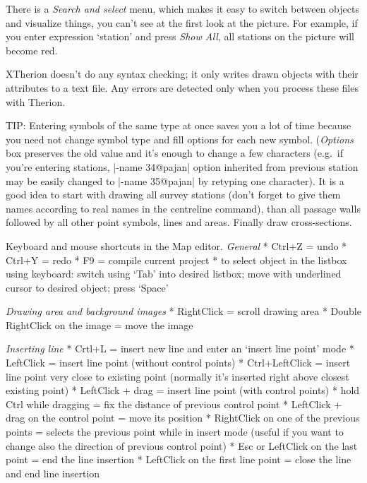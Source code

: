 
There is a {\it Search and select} menu, which makes it easy to
switch between objects and visualize things, you can't see at the first 
look at the picture. For example, if you enter expression `station' and 
press {\it Show All}, all stations on the picture will become red. 

XTherion doesn't do any syntax checking; it only writes drawn objects with their 
attributes to a text file. Any errors are detected only when you process these 
files with Therion.

TIP: Entering symbols of the same type at once saves you a lot of time 
because you need not change symbol type and fill options for each new symbol.
({\it Options} box preserves the old value and it's enough to change a few 
characters (e.g.~if you're entering stations, |-name 34@pajan| option inherited 
from previous station may be easily changed to |-name 35@pajan| by retyping one 
character). 
It is a good idea to start with drawing all survey stations (don't forget to 
give them names according to real names in the centreline command), than all 
passage walls followed by all other point symbols, lines and areas. Finally 
draw cross-sections.

\subsubchapter Keyboard and mouse shortcuts in the Map editor.
{\it General}
\list
 * Ctrl+Z = undo
 * Ctrl+Y = redo
 * F9 = compile current project
 * to select object in the listbox using keyboard:
    switch using `Tab' into desired listbox;
    move with underlined cursor to desired object;
    press `Space'
\endlist

{\it Drawing area and background images}
\list
 * RightClick = scroll drawing area
 * Double RightClick on the image = move the image
\endlist

{\it Inserting line}
\list
 * Crtl+L = insert new line and enter an `insert line point' mode
 * LeftClick = insert line point (without control points)
 * Ctrl+LeftClick = insert line point very close to existing point 
    (normally it's inserted right above closest existing point)
 * LeftClick + drag = insert line point (with control points)
 * hold Ctrl while dragging = fix the distance of previous control point
 * LeftClick + drag on the control point = move its position
 * RightClick on one of the previous points = selects the previous point while 
    in insert mode (useful if you want to change also the direction of
    previous control point)
 * Esc or LeftClick on the last point = end the line insertion
 * LeftClick on the first line point = close the line and end line insertion
\endlist

